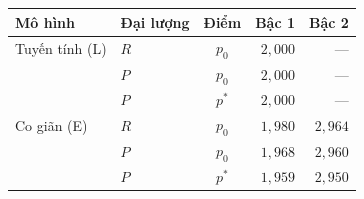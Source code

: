 
\begin{tabular}{@{}llcrr@{}}
\toprule
Mô hình & Đại lượng & Điểm & Bậc 1 & Bậc 2 \\
\midrule
Tuyến tính (L) & $R$ & $p_0$ & $2{,}000$ & --- \\
 & $P$ & $p_0$ & $2{,}000$ & --- \\
 & $P$ & $p^*$ & $2{,}000$ & --- \\
\midrule
Co giãn (E) & $R$ & $p_0$ & $1{,}980$ & $2{,}964$ \\
 & $P$ & $p_0$ & $1{,}968$ & $2{,}960$ \\
 & $P$ & $p^*$ & $1{,}959$ & $2{,}950$ \\
\bottomrule
\end{tabular}
